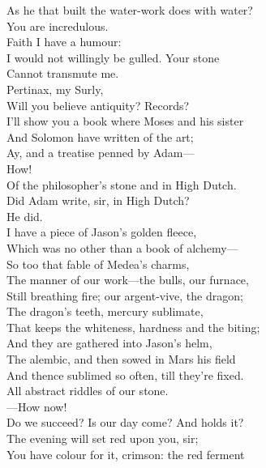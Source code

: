 \documentclass[a4paper,oneside,12pt]{memoir}
\begin{document}
\begin{drama*}
\surlyspeaks As he that built the water-work does with water?\\
\mammonspeaks You are incredulous.\\
\surlyspeaks {} Faith I have a humour:\\
I would not willingly be gulled. Your stone\\
Cannot transmute me.\\
\mammonspeaks {} Pertinax, my Surly,\\
Will you believe antiquity? Records?\\
I'll show you a book where Moses and his sister\\
And Solomon have written of the art;\\
Ay, and a treatise penned by Adam---\\
\surlyspeaks {} How!\\
\mammonspeaks Of the philosopher's stone and in High Dutch.\\
\surlyspeaks Did Adam write, sir, in High Dutch?\\
\mammonspeaks {} He did.\\
I have a piece of Jason's golden fleece,\\
Which was no other than a book of alchemy---\\
So too that fable of Medea's charms,\\
The manner of our work---the bulls, our furnace,\\
Still breathing fire; our argent-vive, the dragon;\\
The dragon's teeth, mercury sublimate,\\
That keeps the whiteness, hardness and the biting;\\
And they are gathered into Jason's helm,\\
The alembic, and then sowed in Mars his field\\
And thence sublimed so often, till they're fixed.\\
All abstract riddles of our stone.\\
 ---How now!\\
Do we succeed? Is our day come? And holds it?\\
\facespeaks The evening will set red upon you, sir;\\
You have colour for it, crimson: the red ferment\\

\end{drama*}
\end{document}
